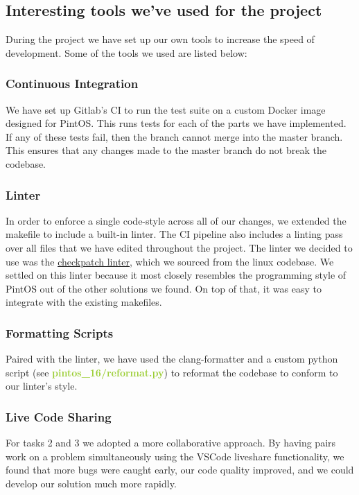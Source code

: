 \documentclass{report}
\newcommand{\file}[1]{\textcolor{YellowGreen}{\textbf{#1}}}
\begin{document}
		\subsection*{Interesting tools we've used for the project}
		During the project we have set up our own tools to increase the speed of
		development. Some of the tools we used are listed below:

			\subsubsection*{Continuous Integration}
			We have set up Gitlab's CI to run the test suite on a custom Docker 
			image designed for PintOS. This runs tests for each of the parts we 
			have implemented. If any of these tests fail, then the branch cannot
			merge into the master branch. This ensures that any changes
			made to the master branch do not break the codebase.
			
			\subsubsection*{Linter}
			In order to enforce a single code-style across all of our changes, 
			we extended the makefile to include a built-in linter. The CI 
			pipeline also includes a linting pass over all files that we have 
			edited throughout the project. The linter we decided to use was 
			the \textcolor{blue}{\underline{\href{https://github.com/torvalds/linux/blob/master/scripts
			/checkpatch.pl}{checkpatch linter}}}, which we sourced from the linux codebase.
			We settled on this linter because it most closely resembles the programming style of
			PintOS out of the other solutions we found.
			On top of that, it was easy to integrate with the existing makefiles.
			
			\subsubsection*{Formatting Scripts}
			Paired with the linter, we have used the clang-formatter and a 
			custom python script (see \file{pintos\_16/reformat.py}) to reformat the 
			codebase to conform to our linter's style.

			\subsubsection*{Live Code Sharing}
			For tasks 2 and 3 we adopted a more collaborative approach. 
			By having pairs work on a problem simultaneously using the 
			VSCode liveshare functionality, we found that more bugs were caught 
			early, our code quality improved, and we could develop our solution much
			more rapidly.
\end{document}

